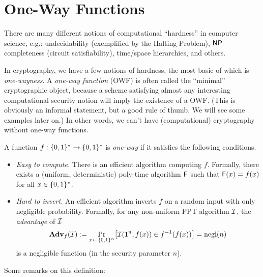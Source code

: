 \documentclass[11pt]{article}
\begin{document}
\section{One-Way Functions}
\label{sec:one-way-functions}

There are many different notions of computational ``hardness'' in
computer science, e.g.: undecidability (exemplified by the Halting
Problem), $\mathsf{NP}$-completeness (circuit satisfiability), time/space
hierarchies, and others.

In cryptography, we have a few notions of hardness, the most basic of
which is \emph{one-wayness}.  A \emph{one-way function} (OWF) is often
called the ``minimal'' cryptographic object, because a scheme
satisfying almost any interesting computational security notion will
imply the existence of a OWF.  (This is obviously an informal
statement, but a good rule of thumb.  We will see some examples later
on.)  In other words, we can't have (computational) cryptography
without one-way functions.

\begin{definition}
  \label{def:owf}
  A function $f : \{0,1\}^{*} \to \{0,1\}^{*}$ is \emph{one-way} if it
  satisfies the following conditions.
  \begin{itemize}
  \item \emph{Easy to compute.}  There is an efficient algorithm
    computing $f$.  Formally, there exists a (uniform, deterministic)
    poly-time algorithm $\mathsf{F}$ such that $\mathsf{F}(x) = f(x)$ for
    all $x \in \{0,1\}^{*}$.
  \item \emph{Hard to invert.}  An efficient algorithm inverts $f$ on
    a random input with only negligible probability.  Formally, for
    any non-uniform PPT algorithm $\mathcal{I}$, the \emph{advantage} of
    $\mathcal{I}$ \[ \advan_{f}(\Inv) := \Pr_{x \gets \bit^{n}} \bracks*{
      \Inv(1^{n}, f(x)) \in f^{-1}(f(x)) } = \negl(n) \] is a
    negligible function (in the security parameter $n$).
  \end{itemize}
\end{definition}

\noindent Some remarks on this definition:
\end{document}
